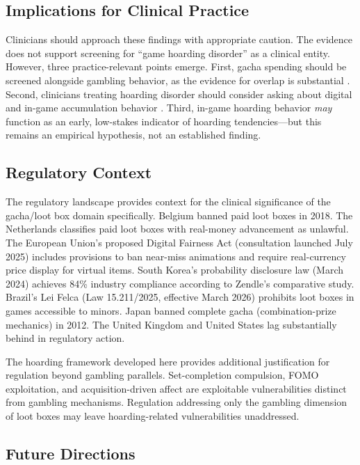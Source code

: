 \documentclass[12pt]{article}
\begin{document}
\subsection{Implications for Clinical Practice}

Clinicians should approach these findings with appropriate caution. The evidence does not support screening for ``game hoarding disorder'' as a clinical entity. However, three practice-relevant points emerge. First, gacha spending should be screened alongside gambling behavior, as the evidence for overlap is substantial \citep{LopezGonzalez2024, Spicer2022}. Second, clinicians treating hoarding disorder should consider asking about digital and in-game accumulation behavior \citep{Thorpe2019}. Third, in-game hoarding behavior \textit{may} function as an early, low-stakes indicator of hoarding tendencies---but this remains an empirical hypothesis, not an established finding.

\subsection{Regulatory Context}

The regulatory landscape provides context for the clinical significance of the gacha/loot box domain specifically. Belgium banned paid loot boxes in 2018. The Netherlands classifies paid loot boxes with real-money advancement as unlawful. The European Union's proposed Digital Fairness Act (consultation launched July 2025) includes provisions to ban near-miss animations and require real-currency price display for virtual items. South Korea's probability disclosure law (March 2024) achieves 84\% industry compliance according to Zendle's \citeyearpar{Zendle2025} comparative study. Brazil's Lei Felca (Law 15.211/2025, effective March 2026) prohibits loot boxes in games accessible to minors. Japan banned complete gacha (combination-prize mechanics) in 2012. The United Kingdom and United States lag substantially behind in regulatory action.

The hoarding framework developed here provides additional justification for regulation beyond gambling parallels. Set-completion compulsion, FOMO exploitation, and acquisition-driven affect are exploitable vulnerabilities distinct from gambling mechanisms. Regulation addressing only the gambling dimension of loot boxes may leave hoarding-related vulnerabilities unaddressed.

\subsection{Future Directions}
\end{document}
